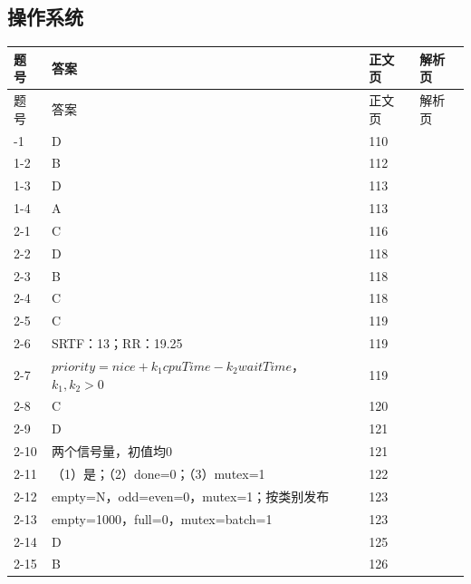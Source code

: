 \documentclass{sidenotes-simplex}
\begin{document}
\subsection*{操作系统}
{\fontsize{9.3}{12}\selectfont
\begin{longtable}{@{}p{18mm}p{87mm}p{20mm}p{20mm}@{}}\toprule 题号 & 答案 & 正文页 & 解析页 \\ \midrule\endfirsthead\toprule 题号 & 答案 & 正文页 & 解析页 \\ \midrule\endhead\bottomrule\endfoot
1-1 & D & 110 & \hyperref[a:OS01-E01]{\pageref*{a:OS01-E01}} \\
1-2 & B & 112 & \hyperref[a:OS01-E02]{\pageref*{a:OS01-E02}} \\
1-3 & D & 113 & \hyperref[a:OS01-E03]{\pageref*{a:OS01-E03}} \\
1-4 & A & 113 & \hyperref[a:OS01-E04]{\pageref*{a:OS01-E04}} \\
2-1 & C & 116 & \hyperref[a:OS02-E01]{\pageref*{a:OS02-E01}} \\
2-2 & D & 118 & \hyperref[a:OS02-E02]{\pageref*{a:OS02-E02}} \\
2-3 & B & 118 & \hyperref[a:OS02-E03]{\pageref*{a:OS02-E03}} \\
2-4 & C & 118 & \hyperref[a:OS02-E04]{\pageref*{a:OS02-E04}} \\
2-5 & C & 119 & \hyperref[a:OS02-E05]{\pageref*{a:OS02-E05}} \\
2-6 & SRTF：13；RR：19.25 & 119 & \hyperref[a:OS02-E06]{\pageref*{a:OS02-E06}} \\
2-7 & \(priority=nice+k_1cpuTime-k_2waitTime\)，\(k_1,k_2>0\) & 119 & \hyperref[a:OS02-E07]{\pageref*{a:OS02-E07}} \\
2-8 & C & 120 & \hyperref[a:OS02-E08]{\pageref*{a:OS02-E08}} \\
2-9 & D & 121 & \hyperref[a:OS02-E09]{\pageref*{a:OS02-E09}} \\
2-10 & 两个信号量，初值均0 & 121 & \hyperref[a:OS02-E10]{\pageref*{a:OS02-E10}} \\
2-11 & （1）是；（2）done=0；（3）mutex=1 & 122 & \hyperref[a:OS02-E11]{\pageref*{a:OS02-E11}} \\
2-12 & empty=N，odd=even=0，mutex=1；按类别发布 & 123 & \hyperref[a:OS02-E12]{\pageref*{a:OS02-E12}} \\
2-13 & empty=1000，full=0，mutex=batch=1 & 123 & \hyperref[a:OS02-E13]{\pageref*{a:OS02-E13}} \\
2-14 & D & 125 & \hyperref[a:OS02-E14]{\pageref*{a:OS02-E14}} \\
2-15 & B & 126 & \hyperref[a:OS02-E15]{\pageref*{a:OS02-E15}} \\

\end{longtable}}
\end{document}
